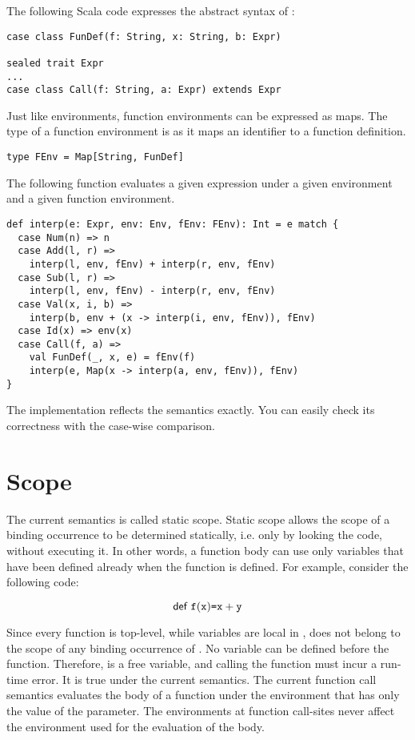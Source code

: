 The following Scala code expresses the abstract syntax of \lang:

\begin{verbatim}
case class FunDef(f: String, x: String, b: Expr)

sealed trait Expr
...
case class Call(f: String, a: Expr) extends Expr
\end{verbatim}

Just like environments, function environments can be expressed as maps.
The type of a function environment is  as it maps an
identifier to a function definition.

\begin{verbatim}
type FEnv = Map[String, FunDef]
\end{verbatim}

The following function evaluates a given expression under a given environment
and a given function environment.

\begin{verbatim}
def interp(e: Expr, env: Env, fEnv: FEnv): Int = e match {
  case Num(n) => n
  case Add(l, r) =>
    interp(l, env, fEnv) + interp(r, env, fEnv)
  case Sub(l, r) =>
    interp(l, env, fEnv) - interp(r, env, fEnv)
  case Val(x, i, b) =>
    interp(b, env + (x -> interp(i, env, fEnv)), fEnv)
  case Id(x) => env(x)
  case Call(f, a) =>
    val FunDef(_, x, e) = fEnv(f)
    interp(e, Map(x -> interp(a, env, fEnv)), fEnv)
}
\end{verbatim}

The implementation reflects the semantics exactly. You can easily check its
correctness with the case-wise comparison.

\section{Scope}

The current semantics is called static scope. Static scope allows the scope of a
binding occurrence to be determined statically, i.e. only by looking the code,
without executing it. In other words, a function body can use only variables
that have been defined already when the function is defined.
For example, consider the following code:

\[
  \textsf{def}\ \texttt{f}(\texttt{x})\texttt{=}\texttt{x}+\texttt{y}
\]

Since every function is top-level, while variables are local in \lang, 
does not belong to the scope of any binding occurrence of . No variable
can be defined before the function. Therefore,
 is a free variable, and calling the function  must incur a
run-time error. It is true under the current semantics. The current function
call semantics evaluates the body of a function under the environment that has
only the value of the parameter. The environments at function call-sites never
affect the environment used for the evaluation of the body.

